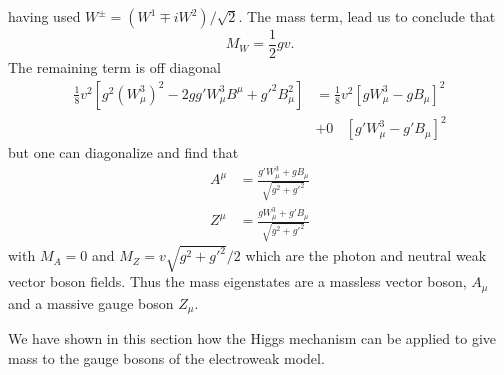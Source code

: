 having used $W^{\pm} = ( W^{1} \mp i W^{2} ) / \sqrt{2}$. The mass
term, lead us to conclude that
\begin{equation}
  \label{eq:49}
  M_{W} = \frac{1}{2} g v.
\end{equation}
The remaining term is off diagonal
\begin{equation}
  \label{eq:50}
  \begin{split}
    \frac{1}{8} v^{2} [g^{2} (W_{\mu}^{3})^{2} - 2 g g' W_{\mu}^{3}
    B^{\mu} + g'^{2} B_{\mu}^{2} ] &= \frac{1}{8} v^{2} [g
    W^{3}_{\mu} - g B_{\mu} ]^{2} \\
    \quad &+ 0 \phantom{v^{2}} [g' W^{3}_{\mu} - g' B_{\mu} ]^{2}
  \end{split}
\end{equation}
but one can diagonalize and find that
\begin{equation}
  \label{eq:51}
  \begin{split}
    A^{\mu} &= \frac{g' W_{\mu}^{3} + g B_{\mu}}{\sqrt{g^{2} +
        g'^{2}}} \\
    Z^{\mu} &= \frac{g W_{\mu}^{3} + g' B_{\mu}}{\sqrt{g^{2} +
        g'^{2}}}
  \end{split}
\end{equation}
with $M_{A} = 0$ and $M_{Z} = v \sqrt{g^{2} + g'^{2}} / 2$ which are
the photon and neutral weak vector boson fields.
Thus the mass eigenstates are a massless vector boson, $A_{\mu}$ and a
massive gauge boson $Z_{\mu}$.

We have shown in this section how the Higgs mechanism can be applied
to give mass to the gauge bosons of the electroweak model.
